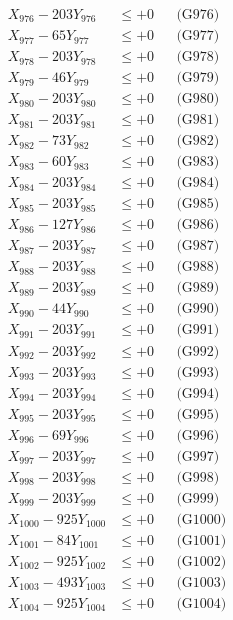 \documentclass[a4paper,10pt]{article}
\begin{document}
{\begin{align}
X_{976} - 203Y_{976} &\leq +0 && \text{(G976)} \\
X_{977} - 65Y_{977} &\leq +0 && \text{(G977)} \\
X_{978} - 203Y_{978} &\leq +0 && \text{(G978)} \\
X_{979} - 46Y_{979} &\leq +0 && \text{(G979)} \\
X_{980} - 203Y_{980} &\leq +0 && \text{(G980)} \\
\allowbreak
X_{981} - 203Y_{981} &\leq +0 && \text{(G981)} \\
X_{982} - 73Y_{982} &\leq +0 && \text{(G982)} \\
X_{983} - 60Y_{983} &\leq +0 && \text{(G983)} \\
X_{984} - 203Y_{984} &\leq +0 && \text{(G984)} \\
X_{985} - 203Y_{985} &\leq +0 && \text{(G985)} \\
X_{986} - 127Y_{986} &\leq +0 && \text{(G986)} \\
X_{987} - 203Y_{987} &\leq +0 && \text{(G987)} \\
X_{988} - 203Y_{988} &\leq +0 && \text{(G988)} \\
X_{989} - 203Y_{989} &\leq +0 && \text{(G989)} \\
X_{990} - 44Y_{990} &\leq +0 && \text{(G990)} \\
\allowbreak
X_{991} - 203Y_{991} &\leq +0 && \text{(G991)} \\
X_{992} - 203Y_{992} &\leq +0 && \text{(G992)} \\
X_{993} - 203Y_{993} &\leq +0 && \text{(G993)} \\
X_{994} - 203Y_{994} &\leq +0 && \text{(G994)} \\
X_{995} - 203Y_{995} &\leq +0 && \text{(G995)} \\
X_{996} - 69Y_{996} &\leq +0 && \text{(G996)} \\
X_{997} - 203Y_{997} &\leq +0 && \text{(G997)} \\
X_{998} - 203Y_{998} &\leq +0 && \text{(G998)} \\
X_{999} - 203Y_{999} &\leq +0 && \text{(G999)} \\
X_{1000} - 925Y_{1000} &\leq +0 && \text{(G1000)} \\
\allowbreak
X_{1001} - 84Y_{1001} &\leq +0 && \text{(G1001)} \\
X_{1002} - 925Y_{1002} &\leq +0 && \text{(G1002)} \\
X_{1003} - 493Y_{1003} &\leq +0 && \text{(G1003)} \\
X_{1004} - 925Y_{1004} &\leq +0 && \text{(G1004)} \\

\end{align}}
\end{document}
